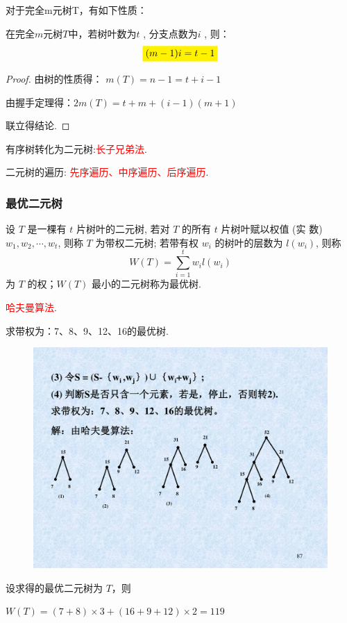 \noindent 对于完全m元树T，有如下性质：
\begin{theorem}
	在完全$m$元树$T$中，若树叶数为$t$ , 分支点数为$i$ , 则：
	\[
	\colorbox{yellow}{$(m-1)i= t-1 $}
	\]
\end{theorem}
\begin{proof}
	由树的性质得：
	$m(T) = n-1 = t+i -1$
	
	由握手定理得：$2m(T)=t+m+(i-1)(m+1)$
	
	联立得结论.
\end{proof}


\noindent 有序树转化为二元树:\textcolor{red}{长子兄弟法}.

\noindent 二元树的遍历: \textcolor{red}{先序遍历、中序遍历、后序遍历}.


\subsubsection{最优二元树}
\begin{definition}
设 \( T \) 是一棵有 \( t \) 片树叶的二元树, 若对 \( T \) 的所有 \( t \) 片树叶赋以权值 (实 数) \( w_{1}, w_{2}, \cdots, w_{t} \), 则称 \( T \) 为带权二元树; 若带有权 \( w_{i} \) 的树叶的层数为 \( l\left(w_{i}\right) \), 则称
\[
W(T)=\sum_{i=1}^{t} w_{i} l\left(w_{i}\right)
\]为 $T$ 的权；$W(T)$ 最小的二元树称为最优树.
\end{definition}

 \textcolor{red}{哈夫曼算法}.
\begin{example}
	求带权为：7、8、9、12、16的最优树.
	\begin{figure}[H]
		\small
		\centering 
		\includegraphics[scale=0.65]{image/CH2_hufman.pdf}  
		\label{figkff1ik}  
	\end{figure}

设求得的最优二元树为 $T$，则

$W(T)=(7+8)\times 3+(16+9+12)\times 2=119$
\end{example}







